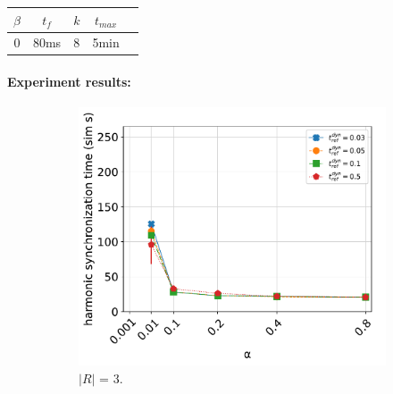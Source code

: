 		\begin{center}
		\begin{tabular}{ |c|c|c|c|c| } 
		\hline
		$\beta$ & $t_f$ & $k$ & $t_{max}$ \\
		\hline
		0 & 80ms & 8 & 5min \\
		\hline
		\end{tabular}
		\label{tab:exp_phase_sync_hyperparam_tuning}
		\end{center}
		
		\paragraph{Experiment results:\nl}
		
		\begin{figure}[ht!]
		  \begin{subfigure}[b]{0.5\textwidth}
			\centering\captionsetup{width=.9\linewidth}%
			\includegraphics[width=\textwidth]{Assets/DocSegments/Chapters/ExperimentsAndResults/Figures/PerfScores/t_ref_dyn_x_alpha_hyperparamtuning_experiment_plot_collsize3.pdf}
			\caption{$|R|$ = 3.}
			\label{fig:sub:t_ref_dyn_x_alpha_collsize3}
		  \end{subfigure}
		  \begin{subfigure}[b]{0.5\textwidth}
			\centering\captionsetup{width=.9\linewidth}%

\end{subfigure}
\end{figure}
